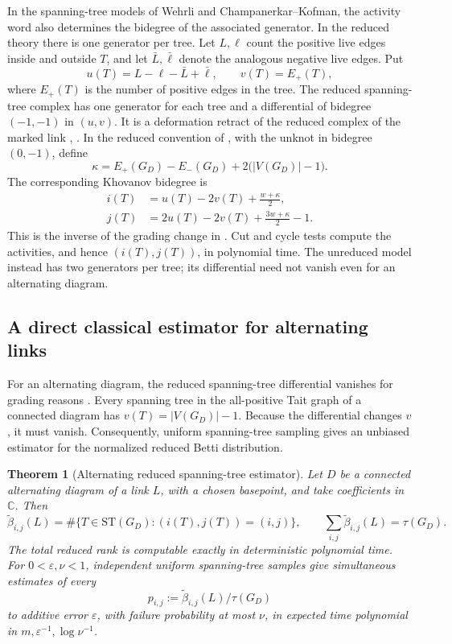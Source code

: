 \documentclass[a4paper,onecolumn,unpublished]{quantumarticle}
\theoremstyle{plain}
\newtheorem{theorem}{Theorem}
\theoremstyle{definition}
\theoremstyle{definition}
\numberwithin{equation}{section}
\begin{document}
In the spanning-tree models of Wehrli and Champanerkar--Kofman, the activity word also determines the bidegree of the associated generator. In the reduced theory there is one generator per tree. Let \(L,\ell\) count the positive live edges inside and outside \(T\), and let \(\bar L,\bar\ell\) denote the analogous negative live edges. Put
\[
 u(T)=L-\ell-\bar L+\bar\ell,\qquad v(T)=E_+(T),
\]
where \(E_+(T)\) is the number of positive edges in the tree. The reduced spanning-tree complex has one generator for each tree and a differential of bidegree \((-1,-1)\) in \((u,v)\). It is a deformation retract of the reduced complex of the marked link \cite[Theorem 3]{champanerkar2008spanningtrees}, \cite[Theorem 2]{ChampanerkarKofmanMutation2008}. In the reduced convention of , with the unknot in bidegree \((0,-1)\), define
\[
 \kappa=E_+(G_D)-E_-(G_D)+2\bigl(|V(G_D)|-1\bigr).
\]
The corresponding Khovanov bidegree is
\begin{align}
 i(T)&=u(T)-2v(T)+\frac{w+\kappa}{2}, \nonumber\\
 j(T)&=2u(T)-2v(T)+\frac{3w+\kappa}{2}-1 .
 \label{eq:tree-gradings}
\end{align}
This is the inverse of the grading change in \cite[eq.~(1)]{champanerkar2008spanningtrees}. Cut and cycle tests compute the activities, and hence \((i(T),j(T))\), in polynomial time. The unreduced model instead has two generators per tree; its differential need not vanish even for an alternating diagram.

\subsection{A direct classical estimator for alternating links}

For an alternating diagram, the reduced spanning-tree differential vanishes for grading reasons \cite[Theorem 7 and Remark 1]{champanerkar2008spanningtrees}. Every spanning tree in the all-positive Tait graph of a connected diagram has \(v(T)=|V(G_D)|-1\). Because the differential changes \(v\), it must vanish. Consequently, uniform spanning-tree sampling gives an unbiased estimator for the normalized reduced Betti distribution.

\begin{theorem}[Alternating reduced spanning-tree estimator]
\label{thm:alternating-tree-estimator}
Let \(D\) be a connected alternating diagram of a link \(L\), with a chosen basepoint, and take coefficients in \(\mathbb C\). Then
\[
 \widetilde\beta_{i,j}(L)
 =\#\{T\in\mathrm{ST}(G_D):(i(T),j(T))=(i,j)\},
 \qquad
 \sum_{i,j}\widetilde\beta_{i,j}(L)=\tau(G_D).
\]
The total reduced rank is computable exactly in deterministic polynomial time. For \(0<\varepsilon,\nu<1\), independent uniform spanning-tree samples give simultaneous estimates of every
\[
 p_{i,j}:=\widetilde\beta_{i,j}(L)/\tau(G_D)
\]
to additive error \(\varepsilon\), with failure probability at most \(\nu\), in expected time polynomial in \(m,\varepsilon^{-1},\log\nu^{-1}\).
\end{theorem}
\end{document}
